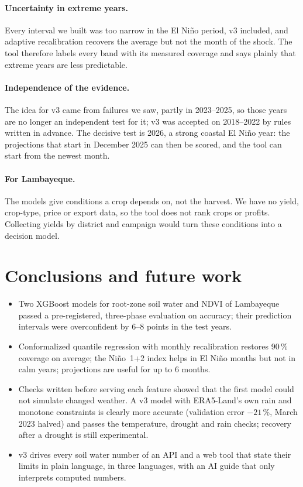 \documentclass[11pt,a4paper]{article}
\begin{document}
\paragraph{Uncertainty in extreme years.} Every interval we built was too narrow in the El Ni\~no period, v3 included, and
adaptive recalibration recovers the average but not the month of the shock. The tool therefore labels every band with
its measured coverage and says plainly that extreme years are less predictable.

\paragraph{Independence of the evidence.} The idea for v3 came from failures we saw, partly in 2023--2025, so those years
are no longer an independent test for it; v3 was accepted on 2018--2022 by rules written in advance. The decisive test is
2026, a strong coastal El Ni\~no year: the projections that start in December 2025 can then be scored, and the tool can
start from the newest month.

\paragraph{For Lambayeque.} The models give conditions a crop depends on, not the harvest. We have no yield, crop-type,
price or export data, so the tool does not rank crops or profits. Collecting yields by district and campaign would turn
these conditions into a decision model.

\section{Conclusions and future work}
\begin{itemize}
\item Two XGBoost models for root-zone soil water and NDVI of Lambayeque passed a pre-registered, three-phase evaluation
on accuracy; their prediction intervals were overconfident by 6--8 points in the test years.
\item Conformalized quantile regression with monthly recalibration restores 90\,\% coverage on average; the Ni\~no~1+2 index
helps in El Ni\~no months but not in calm years; projections are useful for up to 6 months.
\item Checks written before serving each feature showed that the first model could not simulate changed weather. A v3
model with ERA5-Land's own rain and monotone constraints is clearly more accurate (validation error $-21$\,\%, March 2023
halved) and passes the temperature, drought and rain checks; recovery after a drought is still experimental.
\item v3 drives every soil water number of an API and a web tool that state their limits in plain language, in three
languages, with an AI guide that only interprets computed numbers.
\end{itemize}
\end{document}
